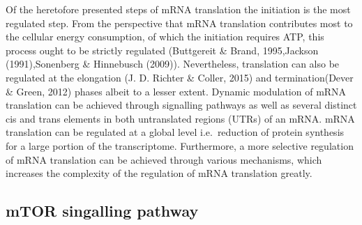 \documentclass[12pt,openany]{book}
\begin{document}
Of the heretofore presented steps of mRNA translation the initiation is
the most regulated step. From the perspective that mRNA translation
contributes most to the cellular energy consumption, of which the
initiation requires ATP, this process ought to be strictly regulated
(Buttgereit \& Brand, 1995,Jackson (1991),Sonenberg \& Hinnebusch
(2009)). Nevertheless, translation can also be regulated at the
elongation (J. D. Richter \& Coller, 2015) and termination(Dever \&
Green, 2012) phases albeit to a lesser extent. Dynamic modulation of
mRNA translation can be achieved through signalling pathways as well as
several distinct cis and trans elements in both untranslated regions
(UTRs) of an mRNA. mRNA translation can be regulated at a global level
i.e.~reduction of protein synthesis for a large portion of the
transcriptome. Furthermore, a more selective regulation of mRNA
translation can be achieved through various mechanisms, which increases
the complexity of the regulation of mRNA translation greatly.

\subsection{mTOR singalling pathway}
\end{document}
